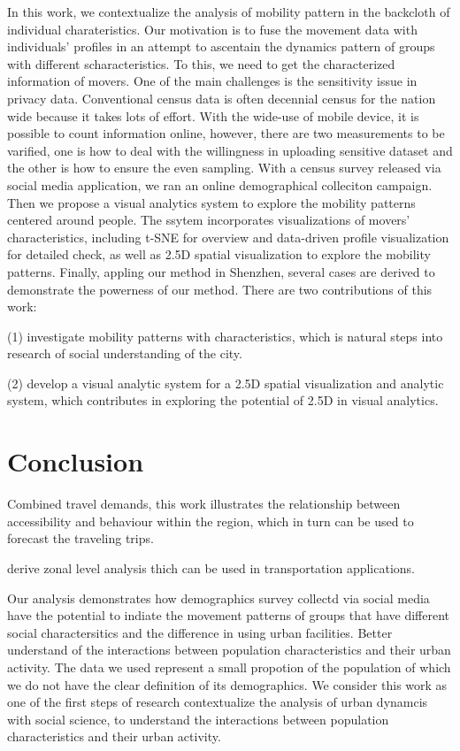 \documentclass{vgtc}                          %
\begin{document}
In this work, we contextualize the analysis of mobility pattern in the backcloth of individual charateristics. Our motivation is to fuse the movement data with individuals' profiles in an attempt to ascentain the dynamics pattern of groups with different scharacteristics. To this, we need to get the characterized information of movers. One of the main challenges is the sensitivity issue in privacy data. Conventional census data is often decennial census for the nation wide because it takes lots of effort. With the wide-use of mobile device, it is possible to count information online, however, there are two measurements to be varified, one is how to deal with the willingness in uploading sensitive dataset and the other is how to ensure the even sampling. With a census survey released via social media application, we ran an online demographical colleciton campaign. Then we propose a visual analytics system to explore the mobility patterns centered around people. The ssytem incorporates visualizations of movers' characteristics, including t-SNE for overview and data-driven profile visualization for detailed check, as well as 2.5D spatial visualization to explore the mobility patterns. Finally, appling our method in Shenzhen, several cases are derived to demonstrate the powerness of our method. There are two contributions of this work: 

(1) investigate mobility patterns with characteristics, which is  natural steps into research of social understanding of the city. 

(2) develop a visual analytic system for a 2.5D spatial visualization and analytic system, which contributes in exploring  the potential of 2.5D in visual analytics.




% 

% 


\section{Conclusion}
\label{sec:conclusion}

Combined travel demands, this work illustrates the relationship between accessibility and behaviour within the region, which in turn can be used to forecast the traveling trips. 

derive zonal level analysis thich can be used in transportation applications.

Our analysis demonstrates how demographics survey collectd via social media have the potential to indiate the movement patterns of groups that have different social charactersitics and the difference in using urban facilities. Better understand of the interactions between population characteristics and their urban activity. The data we used represent a small propotion of the population of which we do not have the clear definition of its demographics. We consider this work as one of the first steps of research contextualize the analysis of urban dynamcis with social science, to understand the  interactions between population characteristics and their urban activity. 



\end{document}
